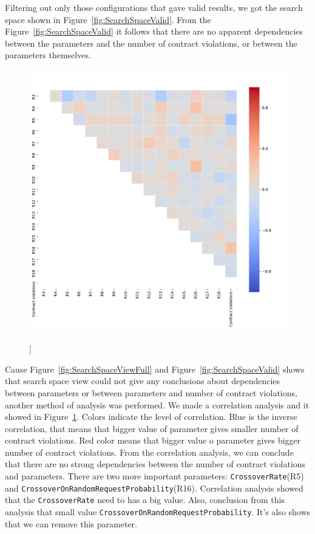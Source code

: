 Filtering out only those configurations that gave valid results, we got the search space shown in Figure~\ref{fig:SearchSpaceValid}. From the Figure~\ref{fig:SearchSpaceValid} it follows that there are no apparent dependencies between the parameters and the number of contract violations, or between the parameters themselves.

\begin{figure}
	\centering
	\includegraphics[width=\textwidth]{images/CorrelationAnalysis.pdf}
	\caption[]]{}
	\label{fig:CorrelationAnalysis}
\end{figure}

Cause Figure~\ref{fig:SearchSpaceViewFull} and Figure~\ref{fig:SearchSpaceValid} shows that search space view could not give any conclusions about dependencies between parameters or between parameters and number of contract violations, another method of analysis was performed.
We made a correlation analysis and it showed in Figure~\ref{fig:CorrelationAnalysis}. Colors indicate the level of correlation. Blue is the inverse correlation, that means that bigger value of parameter gives smaller number of contract violations. Red color means that bigger value o parameter gives bigger number of contract violations.
From the correlation analysis, we can conclude that there are no strong dependencies between the number of contract violations and parameters. There are two more important parameters: \texttt{CrossoverRate}(R5) and \texttt{CrossoverOnRandomRequestProbability}(R16).
Correlation analysis showed that the \texttt{CrossoverRate} need to has a big value. Also, conclusion from this analysis that small value  \texttt{CrossoverOnRandomRequestProbability}. It's also shows that we can remove this parameter. 

